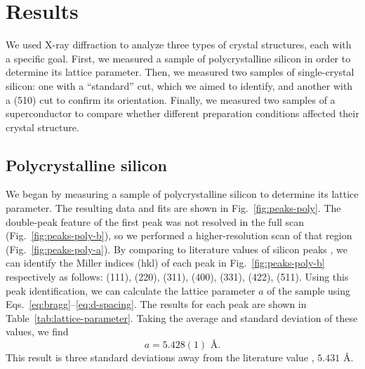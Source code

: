 \documentclass{../paper}
\newcommand{\fig}[1]{Fig.~#1}
\newcommand{\tab}[1]{Table~#1}
\newcommand{\eqs}[2]{Eqs.~#1--#2}
\begin{document}
\section{Results}\label{sec:results}

We used X-ray diffraction to analyze three types of crystal structures, each with a specific goal. First, we measured a sample of polycrystalline silicon in order to determine its lattice parameter. Then, we measured two samples of single-crystal silicon: one with a “standard” cut, which we aimed to identify, and another with a (510) cut to confirm its orientation. Finally, we measured two samples of a superconductor to compare whether different preparation conditions affected their crystal structure.

\subsection{Polycrystalline silicon}

We began by measuring a sample of polycrystalline silicon to determine its lattice parameter. The resulting data and fits are shown in \fig{\ref{fig:peaks-poly}}. The double-peak feature of the first peak was not resolved in the full scan (\fig{\ref{fig:peaks-poly-b}}), so we performed a higher-resolution scan of that region (\fig{\ref{fig:peaks-poly-a}}). By comparing to literature values of silicon peaks \cite{Si}, we can identify the Miller indices (hkl) of each peak in \fig{\ref{fig:peaks-poly-b}} respectively as follows: (111), (220), (311), (400), (331), (422), (511). Using this peak identification, we can calculate the lattice parameter $a$ of the sample using \eqs{\eqref{eq:bragg}}{\eqref{eq:d-spacing}}. The results for each peak are shown in \tab{\ref{tab:lattice-parameter}}. Taking the average and standard deviation of these values, we find
\begin{equation}
  a = 5.428(1) \text{ \AA}.
\end{equation}
This result is three standard deviations away from the literature value \cite{Si}, $5.431$ \AA.
\end{document}
